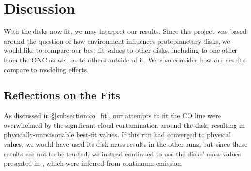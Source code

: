 \chapter{Discussion}
\label{chap:discussion}


With the disks now fit, we may interpret our results. Since this project was based around the question of how environment influences protoplanetary disks, we would like to compare our best fit values to other disks, including to one other from the ONC \citep{Factor2017} as well as to others outside of it. We also consider how our results compare to modeling efforts.






\section{Reflections on the Fits}

As discussed in \S\ref{subsection:co_fit}, our attempts to fit the CO line were overwhelmed by the significant cloud contamination around the disk, resulting in physically-unreasonable best-fit values. If this run had converged to physical values, we would have used its disk mass results in the other runs, but since these results are not to be trusted, we instead continued to use the disks' mass values presented in \citet{Williams2014}, which were inferred from continuum emission.

